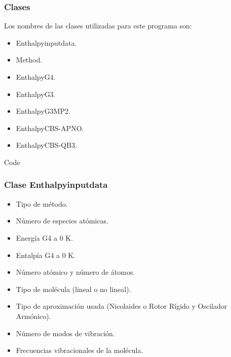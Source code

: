 \documentclass{beamer}
\begin{document}

\begin{frame}
\frametitle{Clases}
Los nombres de las clases utilizadas para este programa son:
\begin{itemize}
	\item Enthalpyinputdata.
	\item Method.
	\item EnthalpyG4.
	\item EnthalpyG3.
	\item EnthalpyG3MP2.
	\item EnthalpyCBS-APNO.
	\item EnthalpyCBS-QB3.
\end{itemize}
\end{frame}

\begin{frame}[fragile]{Code}
\frametitle{Clase Enthalpyinputdata}

\begin{itemize}
	\item Tipo de método.
	\item Número de especies atómicas.
	\item Energía G4 a 0 K.
	\item Entalpía G4 a 0 K.
	\item Número atómico y número de átomos.
	\item Tipo de molécula (lineal o no lineal).
	\item Tipo de aproximación usada (Nicolaides o Rotor Rígido y Oscilador Armónico).
	\item Número de modos de vibración.
	\item Frecuencias vibracionales de la molécula.
\end{itemize}
\end{frame}
\end{document}

